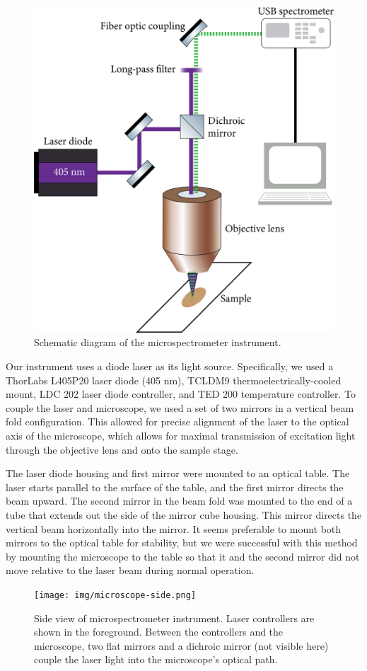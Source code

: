 \begin{figure}[h]
    \centering
    \includegraphics[width=.75\textwidth]{img/optical-diagram.png}
    \caption{Schematic diagram of the microspectrometer instrument.}
    \label{img:optical-diagram}
\end{figure}

Our instrument uses a diode laser as its light source. Specifically, we used a ThorLabs L405P20 laser diode (405 nm), TCLDM9 thermoelectrically-cooled mount, LDC 202 laser diode controller, and TED 200 temperature controller. To couple the laser and microscope, we used a set of two mirrors in a vertical beam fold configuration. This allowed for precise alignment of the laser to the optical axis of the microscope, which allows for maximal transmission of excitation light through the objective lens and onto the sample stage.

The laser diode housing and first mirror were mounted to an optical table. The laser starts parallel to the surface of the table, and the first mirror directs the beam upward. The second mirror in the beam fold was mounted to the end of a tube that extends out the side of the mirror cube housing. This mirror directs the vertical beam horizontally into the mirror. It seems preferable to mount both mirrors to the optical table for stability, but we were successful with this method by mounting the microscope to the table so that it and the second mirror did not move relative to the laser beam during normal operation.

\begin{figure}[H]
    \centering
    \texttt{[image: img/microscope-side.png]}
    \caption[Side view of microspectrometer instrument.]{Side view of microspectrometer instrument. Laser controllers are shown in the foreground. Between the controllers and the microscope, two flat mirrors and a dichroic mirror (not visible here) couple the laser light into the microscope's optical path.}
    \label{img:microscope-side}
\end{figure}

